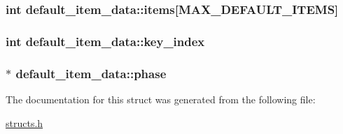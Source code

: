 \hypertarget{structdefault__item__data_afca11eefdd1f0b777d97779af6e6833e}{
\subsubsection[{items}]{\setlength{\rightskip}{0pt plus 5cm}int default\-\_\-item\-\_\-data\-::items\mbox{[}{\bf M\-A\-X\-\_\-\-D\-E\-F\-A\-U\-L\-T\-\_\-\-I\-T\-E\-M\-S}\mbox{]}}}\label{structdefault__item__data_afca11eefdd1f0b777d97779af6e6833e}
\hypertarget{structdefault__item__data_aa7cbd63e2bbe2ef79c29af90a3911fcb}{
\subsubsection[{key\-\_\-index}]{\setlength{\rightskip}{0pt plus 5cm}int default\-\_\-item\-\_\-data\-::key\-\_\-index}}\label{structdefault__item__data_aa7cbd63e2bbe2ef79c29af90a3911fcb}
\hypertarget{structdefault__item__data_aa3a491014b7b0fc299471f65ac37b6f8}{
\subsubsection[{phase}]{$\ast$ default\-\_\-item\-\_\-data\-::phase}}\label{structdefault__item__data_aa3a491014b7b0fc299471f65ac37b6f8}


The documentation for this struct was generated from the following file\-:\begin{DoxyCompactItemize}
\item 
\hyperlink{structs_8h}{structs.\-h}\end{DoxyCompactItemize}
